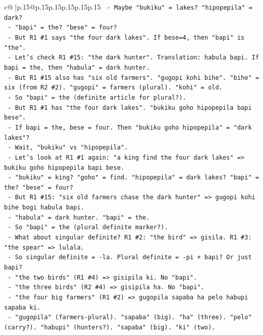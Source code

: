 \documentclass{article}
\begin{document}
{\begin{supertabular}{c@{$\;$}|p{.15\linewidth}@{}p{.15\linewidth}p{.15\linewidth}p{.15\linewidth}p{.15\linewidth}p{.15\linewidth}}
{{{\texttt{        {-} Maybe "bukiku" = lakes? "hipopepila" = dark?} \\
\texttt{        {-} "bapi" = the? "bese" = four?} \\
\texttt{        {-} But R1 \#1 says "the four dark lakes". If bese=4, then "bapi" is "the".} \\
\texttt{        {-} Let's check R1 \#15: "the dark hunter". Translation: habula bapi. If bapi = the, then "habula" = dark hunter.} \\
\texttt{        {-} But R1 \#15 also has "six old farmers". "gugopi kohi bihe". "bihe" = six (from R2 \#2). "gugopi" = farmers (plural). "kohi" = old.} \\
\texttt{        {-} So "bapi" = the (definite article for plural?).} \\
\texttt{        {-} But R1 \#1 has "the four dark lakes". "bukiku goho hipopepila bapi bese".} \\
\texttt{          {-} If bapi = the, bese = four. Then "bukiku goho hipopepila" = "dark lakes"?} \\
\texttt{          {-} Wait, "bukiku" vs "hipopepila".} \\
\texttt{          {-} Let's look at R1 \#1 again: "a king find the four dark lakes" => bukiku goho hipopepila bapi bese.} \\
\texttt{          {-} "bukiku" = king? "goho" = find. "hipopepila" = dark lakes? "bapi" = the? "bese" = four?} \\
\texttt{          {-} But R1 \#15: "six old farmers chase the dark hunter" => gugopi kohi bihe bogi habula bapi.} \\
\texttt{          {-} "habula" = dark hunter. "bapi" = the.} \\
\texttt{          {-} So "bapi" = the (plural definite marker?).} \\
\texttt{          {-} What about singular definite? R1 \#2: "the bird" => gisila. R1 \#3: "the spear" => lulala.} \\
\texttt{          {-} So singular definite = {-}la. Plural definite = {-}pi + bapi? Or just bapi?} \\
\texttt{          {-} "the two birds" (R1 \#4) => gisipila ki. No "bapi".} \\
\texttt{          {-} "the three birds" (R2 \#4) => gisipila ha. No "bapi".} \\
\texttt{          {-} "the four big farmers" (R1 \#2) => gugopila sapaba ha pelo habupi sapaba ki.} \\
\texttt{            {-} "gugopila" (farmers{-}plural). "sapaba" (big). "ha" (three). "pelo" (carry?). "habupi" (hunters?). "sapaba" (big). "ki" (two).} \\
}}}
\end{supertabular}}
\end{document}

